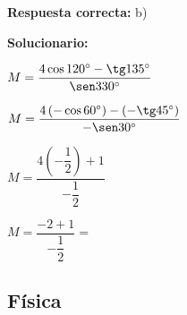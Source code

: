 \begin{enumerate}[resume]
	\textbf{Respuesta correcta:} b)

	\vspace{2mm}
	\textbf{Solucionario:}


	$
	M=\dfrac{4\cos120^\circ-\tg135^\circ}{\sen330^\circ}
	$

	$
	M=\dfrac{4\left(-\cos60^\circ\right)-\left(-\tg45^\circ\right)}{-\sen30^\circ}
	$

	$
	M=\dfrac{4\left(-\dfrac{1}{2}\right)+1}{-\dfrac{1}{2}}
	$

	$
	M=\dfrac{-2+1}{-\dfrac{1}{2}}=$

	\vspace{6mm}

\end{enumerate}




\subsection*{Física}

